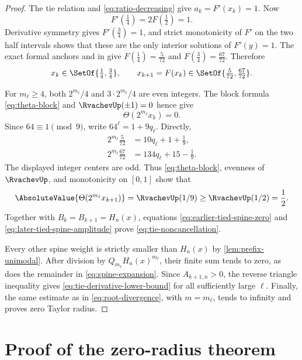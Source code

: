 \documentclass[11pt,oneside]{article}
\theoremstyle{definition}
\theoremstyle{remark}
\newcommand{\ThetaF}{\Theta}
\begin{document}
\begin{proof}
The tie relation and \eqref{eq:ratio-decreasing} give $a_k=F'(x_k)=1$.
Now
\[
 F'(\tfrac14)=2F(\tfrac12)=1.
\]
Derivative symmetry gives $F'(\tfrac34)=1$, and strict monotonicity of $F'$ on
the two half intervals shows that these are the only interior solutions of
$F'(y)=1$.  The exact formal anchors
 and  in
 give
$F(\tfrac14)=\tfrac5{72}$ and $F(\tfrac34)=\tfrac{67}{72}$.  Therefore
\[
 x_k\in\SetOf{\tfrac14,\tfrac34},
 \qquad
 x_{k+1}=F(x_k)\in\SetOf{\tfrac5{72},\tfrac{67}{72}}.
\]

For $m_\ell\geq4$, both $2^{m_\ell}/4$ and $3\cdot2^{m_\ell}/4$ are even
integers.  The block formula \eqref{eq:theta-block} and $\RvachevUp(\pm1)=0$ hence give
\begin{equation}
 \ThetaF(2^{m_\ell}x_k)=0.
 \label{eq:earlier-tied-spine-zero}
\end{equation}
Since $64\equiv1\pmod 9$, write $64^\ell=1+9q_\ell$.  Directly,
\begin{align*}
 2^{m_\ell}\frac5{72}
   &=10q_\ell+1+\frac19,\\
 2^{m_\ell}\frac{67}{72}
   &=134q_\ell+15-\frac19.
\end{align*}
The displayed integer centers are odd.  Thus \eqref{eq:theta-block}, evenness
of $\RvachevUp$, and monotonicity on $[0,1]$ show that
\begin{equation}
 \AbsoluteValue{\ThetaF(2^{m_\ell}x_{k+1})}
 =\RvachevUp(1/9)\geq\RvachevUp(1/2)=\frac12.
 \label{eq:later-tied-spine-amplitude}
\end{equation}
Together with $B_k=B_{k+1}=H_n(x)$, equations
\eqref{eq:earlier-tied-spine-zero} and
\eqref{eq:later-tied-spine-amplitude} prove
\eqref{eq:tie-noncancellation}.

Every other spine weight is strictly smaller than $H_n(x)$ by
\cref{lem:prefix-unimodal}.  After division by $Q_{m_\ell}H_n(x)^{m_\ell}$,
their finite sum tends to zero, as does the remainder in
\eqref{eq:spine-expansion}.  Since $A_{k+1,n}>0$, the reverse triangle
inequality gives \eqref{eq:tie-derivative-lower-bound} for all sufficiently
large $\ell$.  Finally, the same estimate as in \eqref{eq:root-divergence},
with $m=m_\ell$, tends to infinity and proves zero Taylor radius.
\end{proof}

\section{Proof of the zero-radius theorem}
\label{sec:proof-main}
\end{document}
